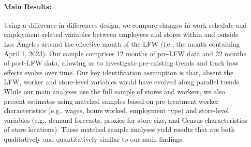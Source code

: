 \documentclass[letterpaper,11pt,leqno]{article}
\theoremstyle{paper}
\begin{document}
\paragraph{Main Results:}
Using a difference-in-differences design, we compare changes in work schedule and employment-related variables between employees and stores within and outside Los Angeles around the effective month of the LFW (i.e., the month containing April 1, 2023). Our sample comprises 12 months of pre-LFW data and 22 months of post-LFW data, allowing us to investigate pre-existing trends and track how effects evolve over time. Our key identification assumption is that, absent the LFW, worker and store-level variables would have evolved along parallel trends. While our main analyses use the full sample of stores and workers, we also present estimates using matched samples based on pre-treatment worker characteristics (e.g., wages, hours worked, employment type) and store-level variables (e.g., demand forecasts, proxies for store size, and Census characteristics of store locations). These matched sample analyses yield results that are both qualitatively and quantitatively similar to our main findings.
\end{document}
